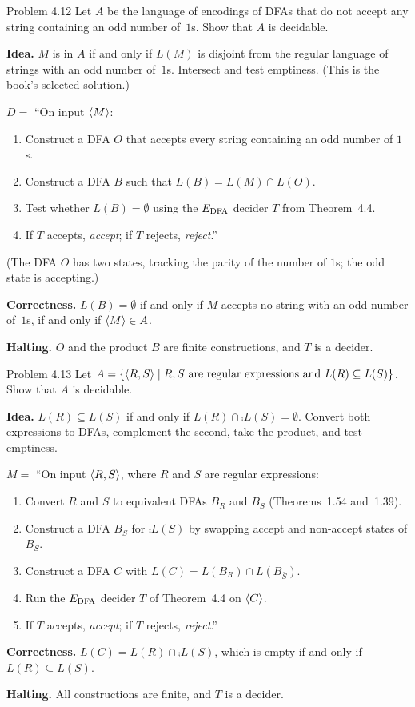 \begin{question}{Problem 4.12}
Let $A$ be the language of encodings of DFAs that do not accept any string
containing an odd number of~$1$s. Show that $A$ is decidable.
\end{question}
\begin{soln}
\textbf{Idea.} $M$ is in $A$ if and only if $L(M)$ is disjoint from the regular language of strings with an odd number of~$1$s. Intersect and test emptiness. (This is the book's selected solution.)

$D=$ ``On input $\langle M\rangle$:
\begin{enumerate}
\item Construct a DFA $O$ that accepts every string containing an odd number of $1$s.
\item Construct a DFA $B$ such that $L(B)=L(M)\cap L(O)$.
\item Test whether $L(B)=\emptyset$ using the $E_{\mathrm{DFA}}$ decider $T$ from Theorem~4.4.
\item If $T$ accepts, \emph{accept}; if $T$ rejects, \emph{reject}.''
\end{enumerate}

(The DFA $O$ has two states, tracking the parity of the number of $1$s; the odd state is accepting.)

\textbf{Correctness.} $L(B)=\emptyset$ if and only if $M$ accepts no string with an odd number of~$1$s, if and only if $\langle M\rangle\in A$.

\textbf{Halting.} $O$ and the product $B$ are finite constructions, and $T$ is a decider.
\end{soln}

\begin{question}{Problem 4.13}
Let $A=\{\langle R,S\rangle\mid R,S\text{ are regular expressions and }L(R)\subseteq L(S)\}$.
Show that $A$ is decidable.
\end{question}
\begin{soln}
\textbf{Idea.} $L(R)\subseteq L(S)$ if and only if $L(R)\cap\comp{L(S)}=\emptyset$. Convert both expressions to DFAs, complement the second, take the product, and test emptiness.

$M=$ ``On input $\langle R,S\rangle$, where $R$ and $S$ are regular expressions:
\begin{enumerate}
\item Convert $R$ and $S$ to equivalent DFAs $B_R$ and $B_S$ (Theorems~1.54 and~1.39).
\item Construct a DFA $B_{\bar S}$ for $\comp{L(S)}$ by swapping accept and non-accept states of $B_S$.
\item Construct a DFA $C$ with $L(C)=L(B_R)\cap L(B_{\bar S})$.
\item Run the $E_{\mathrm{DFA}}$ decider $T$ of Theorem~4.4 on $\langle C\rangle$.
\item If $T$ accepts, \emph{accept}; if $T$ rejects, \emph{reject}.''
\end{enumerate}

\textbf{Correctness.} $L(C)=L(R)\cap\comp{L(S)}$, which is empty if and only if $L(R)\subseteq L(S)$.

\textbf{Halting.} All constructions are finite, and $T$ is a decider.
\end{soln}

